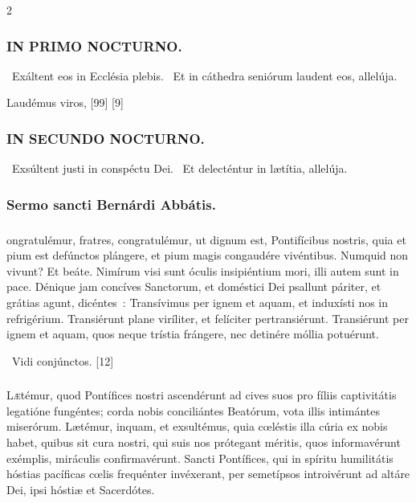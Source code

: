 \documentclass[9pt,twoside]{extarticle}
\begin{document}
\begin{multicols}{2}
\subsubsection*{\center \textsc{IN PRIMO NOCTURNO.}}
\begin{tightlist}{}
\item {}~Exáltent eos in Ecclésia plebis. ~Et in cáthedra seniórum laudent eos, allelúja.
\item {} Laudémus viros,  [99]  [9]
\end{tightlist}

\subsubsection*{\center \textsc{IN SECUNDO NOCTURNO.}}
\begin{tightlist}{}
\item {}~Exsúltent justi in conspéctu Dei. ~Et delecténtur in lætítia, allelúja.
\end{tightlist}

\subsubsection*{\center Sermo sancti Bernárdi Abbátis.}
\subsubsection*{\center {}}
ongratulémur, fratres, congratulémur, ut dignum est, Pontifícibus nostris, quia et pium est defúnctos plángere, et pium magis congaudére vivéntibus. Numquid non vivunt? Et beáte. Nimírum visi sunt óculis insipiéntium mori, illi autem sunt in pace. Dénique jam concíves Sanctorum, et doméstici Dei psallunt páriter, et grátias agunt, dicéntes~: Transívimus per ignem et aquam, et induxísti nos in refrigérium. Transiérunt plane viríliter, et felíciter pertransiérunt. Transiérunt per ignem et aquam, quos neque trístia frángere, nec detinére móllia potuérunt.

\begin{tightlist}{}
\item {}~Vidi conjúnctos. [12]
\end{tightlist}

\subsubsection*{\center {}}
\lettrine{L}ætémur, quod Pontífices nostri ascendérunt ad cives suos pro fíliis captivitátis legatióne fungéntes; corda nobis conciliántes Beatórum, vota illis intimántes miserórum. Lætémur, inquam, et exsultémus, quia cœléstis illa cúria ex nobis habet, quibus sit cura nostri, qui suis nos prótegant méritis, quos informavérunt exémplis, miráculis confirmavérunt. Sancti Pontífices, qui in spíritu humilitátis hóstias pacíficas cœlis frequénter invéxerant, per semetípsos introivérunt ad altáre Dei, ipsi hóstiæ et Sacerdótes.


\end{multicols}
\end{document}
